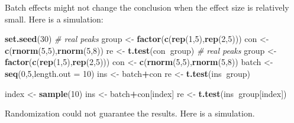 \documentclass[
]{book}
\newenvironment{Shaded}{\begin{snugshade}}{\end{snugshade}}
\newcommand{\CommentTok}[1]{\textcolor[rgb]{0.56,0.35,0.01}{\textit{#1}}}
\newcommand{\DataTypeTok}[1]{\textcolor[rgb]{0.13,0.29,0.53}{#1}}
\newcommand{\DecValTok}[1]{\textcolor[rgb]{0.00,0.00,0.81}{#1}}
\newcommand{\KeywordTok}[1]{\textcolor[rgb]{0.13,0.29,0.53}{\textbf{#1}}}
\newcommand{\NormalTok}[1]{#1}
\newcommand{\OperatorTok}[1]{\textcolor[rgb]{0.81,0.36,0.00}{\textbf{#1}}}
\newcommand{\StringTok}[1]{\textcolor[rgb]{0.31,0.60,0.02}{#1}}
\begin{document}
Batch effects might not change the conclusion when the effect size is relatively small. Here is a simulation:

\begin{Shaded}
\begin{Highlighting}[]
\KeywordTok{set.seed}\NormalTok{(}\DecValTok{30}\NormalTok{)}
\CommentTok{# real peaks}
\NormalTok{group <-}\StringTok{ }\KeywordTok{factor}\NormalTok{(}\KeywordTok{c}\NormalTok{(}\KeywordTok{rep}\NormalTok{(}\DecValTok{1}\NormalTok{,}\DecValTok{5}\NormalTok{),}\KeywordTok{rep}\NormalTok{(}\DecValTok{2}\NormalTok{,}\DecValTok{5}\NormalTok{)))}
\NormalTok{con <-}\StringTok{ }\KeywordTok{c}\NormalTok{(}\KeywordTok{rnorm}\NormalTok{(}\DecValTok{5}\NormalTok{,}\DecValTok{5}\NormalTok{),}\KeywordTok{rnorm}\NormalTok{(}\DecValTok{5}\NormalTok{,}\DecValTok{8}\NormalTok{))}
\NormalTok{re <-}\StringTok{ }\KeywordTok{t.test}\NormalTok{(con}\OperatorTok{~}\NormalTok{group)}
\CommentTok{# real peaks}
\NormalTok{group <-}\StringTok{ }\KeywordTok{factor}\NormalTok{(}\KeywordTok{c}\NormalTok{(}\KeywordTok{rep}\NormalTok{(}\DecValTok{1}\NormalTok{,}\DecValTok{5}\NormalTok{),}\KeywordTok{rep}\NormalTok{(}\DecValTok{2}\NormalTok{,}\DecValTok{5}\NormalTok{)))}
\NormalTok{con <-}\StringTok{ }\KeywordTok{c}\NormalTok{(}\KeywordTok{rnorm}\NormalTok{(}\DecValTok{5}\NormalTok{,}\DecValTok{5}\NormalTok{),}\KeywordTok{rnorm}\NormalTok{(}\DecValTok{5}\NormalTok{,}\DecValTok{8}\NormalTok{))}
\NormalTok{batch <-}\StringTok{ }\KeywordTok{seq}\NormalTok{(}\DecValTok{0}\NormalTok{,}\DecValTok{5}\NormalTok{,}\DataTypeTok{length.out =} \DecValTok{10}\NormalTok{)}
\NormalTok{ins <-}\StringTok{ }\NormalTok{batch}\OperatorTok{+}\NormalTok{con}
\NormalTok{re <-}\StringTok{ }\KeywordTok{t.test}\NormalTok{(ins}\OperatorTok{~}\NormalTok{group)}

\NormalTok{index <-}\StringTok{ }\KeywordTok{sample}\NormalTok{(}\DecValTok{10}\NormalTok{)}
\NormalTok{ins <-}\StringTok{ }\NormalTok{batch}\OperatorTok{+}\NormalTok{con[index]}
\NormalTok{re <-}\StringTok{ }\KeywordTok{t.test}\NormalTok{(ins}\OperatorTok{~}\NormalTok{group[index])}
\end{Highlighting}
\end{Shaded}

Randomization could not guarantee the results. Here is a simulation.
\end{document}
